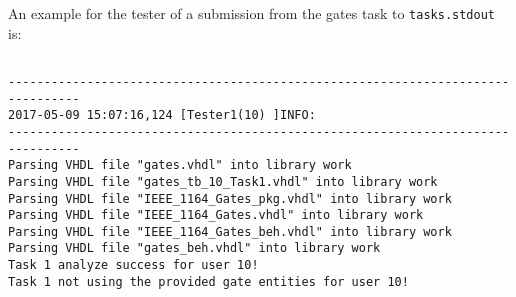 \newpage 

An example for the tester of a submission from the gates task to {\tt tasks.stdout} is:
{\scriptsize
\begin{verbatim}

--------------------------------------------------------------------------------
2017-05-09 15:07:16,124 [Tester1(10) ]INFO:
--------------------------------------------------------------------------------
Parsing VHDL file "gates.vhdl" into library work
Parsing VHDL file "gates_tb_10_Task1.vhdl" into library work
Parsing VHDL file "IEEE_1164_Gates_pkg.vhdl" into library work
Parsing VHDL file "IEEE_1164_Gates.vhdl" into library work
Parsing VHDL file "IEEE_1164_Gates_beh.vhdl" into library work
Parsing VHDL file "gates_beh.vhdl" into library work
Task 1 analyze success for user 10!
Task 1 not using the provided gate entities for user 10!
\end{verbatim}
}
